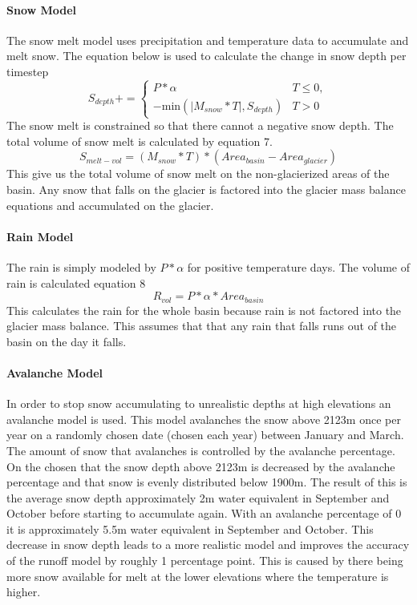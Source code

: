 \documentclass{article}
\begin{document}
\paragraph{Snow Model}
The snow melt model uses precipitation and temperature data to accumulate and melt snow. 
The equation below is used to calculate the change in snow depth per timestep 
\begin{equation}S_{depth} += 
\begin{cases} 
  P*\alpha & T \leq 0,\\
  -\text{min}(|M_{snow}*T|,S_{depth}) &  T > 0
\end{cases}\end{equation}
The snow melt is constrained so that there cannot a negative snow depth. 
The total volume of snow melt is calculated by equation 7.
\begin{equation}S_{melt-vol}=(M_{snow}*T)*({Area}_{basin}-{Area}_{glacier})\end{equation}
This give us the total volume of snow melt on the non-glacierized areas of the basin. Any snow that falls on the glacier is factored into 
the glacier mass balance equations and accumulated on the glacier.
\paragraph{Rain Model}
The rain is simply modeled by $P*\alpha$ for positive temperature days. The volume of rain is calculated equation 8
\begin{equation}R_{vol}=P*\alpha*{Area}_{basin}\end{equation}
This calculates the rain for the whole basin because rain is not factored into the glacier mass balance. This assumes that  that any rain 
that falls runs out of the basin on the day it falls.

\paragraph{Avalanche Model}
In order to stop snow accumulating to unrealistic depths at high elevations an avalanche model is used. This model avalanches the 
snow above 2123m once per year on a randomly chosen date (chosen each year) between January and March. The amount of snow that 
avalanches is controlled by the avalanche percentage. On the chosen that the snow depth above 2123m is decreased by the avalanche 
percentage and that snow is evenly distributed below 1900m. The result of this is the average snow depth approximately 2m water 
equivalent in September and October before starting to accumulate again. With an avalanche percentage of 0 it is approximately 5.5m water 
equivalent in September and October. This decrease in snow depth leads to a more realistic model and improves the accuracy of the runoff 
model by roughly 1 percentage point. This is caused by there being more snow available for melt at the lower elevations where the 
temperature is higher.
\end{document}
